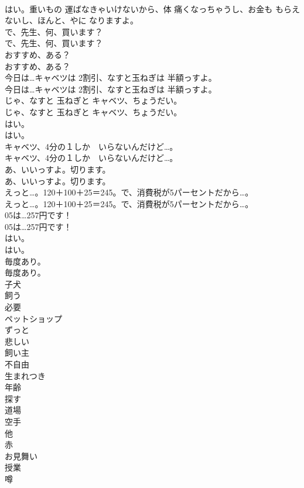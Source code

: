 \documentclass[8pt]{extreport}
\begin{document}
\begin{CJK}{UTF8}{min}
\\	はい。重いもの 運ばなきゃいけないから、体 痛くなっちゃうし、お金も もらえないし、ほんと、やに なりますよ。 
\\	で、先生、何、買います？	
\\	で、先生、何、買います？ 
\\	おすすめ、ある？	
\\	おすすめ、ある？ 
\\	今日は…キャベツは 2割引、なすと玉ねぎは 半額っすよ。	
\\	今日は…キャベツは 2割引、なすと玉ねぎは 半額っすよ。 
\\	じゃ、なすと 玉ねぎと キャベツ、ちょうだい。	
\\	じゃ、なすと 玉ねぎと キャベツ、ちょうだい。 
\\	はい。	
\\	はい。 
\\	キャベツ、4分の１しか　いらないんだけど…。	
\\	キャベツ、4分の１しか　いらないんだけど…。 
\\	あ、いいっすよ。切ります。	
\\	あ、いいっすよ。切ります。 
\\	えっと…。120＋100＋25＝245。で、消費税が5パーセントだから…。	
\\	えっと…。120＋100＋25＝245。で、消費税が5パーセントだから…。 
\\	05は…257円です！	
\\	05は…257円です！ 
\\	はい。	
\\	はい。 
\\	毎度あり。	
\\	毎度あり。 
\\	子犬
\\	飼う
\\	必要
\\	ペットショップ
\\	ずっと
\\	悲しい
\\	飼い主
\\	不自由
\\	生まれつき
\\	年齢
\\	探す
\\	道場
\\	空手
\\	他
\\	赤
\\	お見舞い
\\	授業
\\	噂

\end{CJK}
\end{document}
